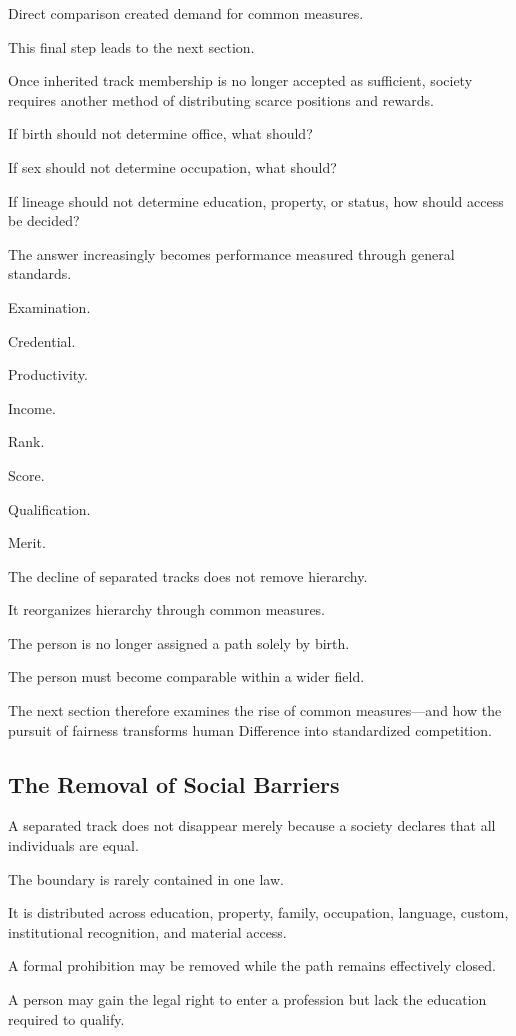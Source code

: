 Direct comparison created demand for common measures.

This final step leads to the next section.

Once inherited track membership is no longer accepted as sufficient, society requires another method of distributing scarce positions and rewards.

If birth should not determine office, what should?

If sex should not determine occupation, what should?

If lineage should not determine education, property, or status, how should access be decided?

The answer increasingly becomes performance measured through general standards.

Examination.

Credential.

Productivity.

Income.

Rank.

Score.

Qualification.

Merit.

The decline of separated tracks does not remove hierarchy.

It reorganizes hierarchy through common measures.

The person is no longer assigned a path solely by birth.

The person must become comparable within a wider field.

The next section therefore examines the rise of common measures—and how the pursuit of fairness transforms human Difference into standardized competition.

\subsection*{\textbf{The Removal of Social Barriers}}


A separated track does not disappear merely because a society declares that all individuals are equal.

The boundary is rarely contained in one law.

It is distributed across education, property, family, occupation, language, custom, institutional recognition, and material access.

A formal prohibition may be removed while the path remains effectively closed.

A person may gain the legal right to enter a profession but lack the education required to qualify.

